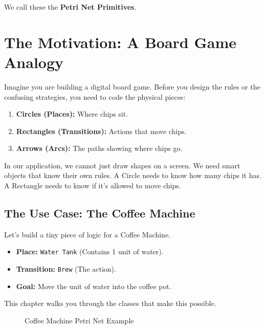 \documentclass[a4paper,11pt,oneside]{report}
\begin{document}
We call these the \textbf{Petri Net Primitives}.

\section{The Motivation: A Board Game Analogy}

Imagine you are building a digital board game. Before you design the rules or the confusing strategies, you need to code the physical pieces:
\begin{enumerate}
    \item \textbf{Circles (Places):} Where chips sit.
    \item \textbf{Rectangles (Transitions):} Actions that move chips.
    \item \textbf{Arrows (Arcs):} The paths showing where chips go.
\end{enumerate}

In our application, we cannot just draw shapes on a screen. We need smart objects that know their own rules. A Circle needs to know how many chips it has. A Rectangle needs to know if it's allowed to move chips.

\subsection{The Use Case: The Coffee Machine}

Let's build a tiny piece of logic for a Coffee Machine.
\begin{itemize}
    \item \textbf{Place:} \texttt{Water Tank} (Contains 1 unit of water).
    \item \textbf{Transition:} \texttt{Brew} (The action).
    \item \textbf{Goal:} Move the unit of water into the coffee pot.
\end{itemize}

This chapter walks you through the classes that make this possible.

\begin{figure}[H]
\centering
{}
\caption{Coffee Machine Petri Net Example}
\label{fig:coffee-machine}
\end{figure}
\end{document}
